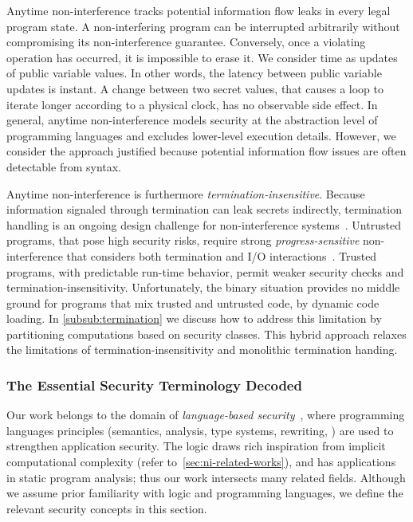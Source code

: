 Anytime non-interference tracks potential information flow leaks in every legal
program state. A non-interfering program can be interrupted arbitrarily without
compromising its non-interference guarantee. Conversely, once a violating
operation has occurred, it is impossible to erase it. We consider time as
updates of public variable values. In other words, the latency between public
variable updates is instant. A change between two secret values, that causes a
loop to iterate longer according to a physical clock, has no observable side
effect. In general, anytime non-interference models security at the abstraction
level of programming languages and excludes lower-level execution details.
However, we consider the approach justified because potential information flow
issues are often detectable from syntax.
 
Anytime non-interference is furthermore \emph{termination-insensitive}. Because
information signaled through termination can leak secrets indirectly,
termination handling is an ongoing design challenge for non-interference
systems~\cite{bay2020}. Untrusted programs, that pose high security risks,
require strong \emph{progress-sensitive} non-interference that considers both
termination and I/O interactions~\cite{hedin2012}. Trusted programs, with
predictable run-time behavior, permit weaker security checks and
termination-insensitivity.
Unfortunately, the binary situation provides no
middle ground for programs that mix trusted and untrusted code, \eg by dynamic
code loading. In \autoref{subsub:termination} we discuss how to address this
limitation by partitioning computations based on security classes. This hybrid
approach relaxes the limitations of termination-insensitivity and monolithic
termination handing.

\subsubsection{The Essential Security Terminology Decoded}
\label{subsubsec:ni-terms}

Our work belongs to the domain of \emph{language-based
security}~\cite{schneider2001,sabelfeld2003}, where programming languages
principles (semantics, analysis, type systems, rewriting, \etc) are used to
strengthen application security. The \lname logic draws rich inspiration from
implicit computational complexity (refer to~\autoref{sec:ni-related-works}), and
has applications in static program analysis; thus our work intersects many
related fields. Although we assume prior familiarity with logic and programming
languages, we define the relevant security concepts in this section.

